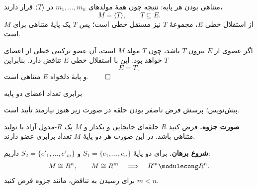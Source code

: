 \begin{frame}[t]{متناهی بودن هر پایه: نتیجه}
    \label{lec10:finite-basis-conclusion}
    چون همهٔ مولدهای $m_1,\ldots,m_n$ در $\langle T\rangle$ قرار دارند،
    \[
        M=\langle T\rangle,\qquad T\subseteq E.
    \]
    از استقلال خطی $E$، مجموعهٔ $T$ نیز مستقل خطی است؛
    پس $T$ یک پایهٔ متناهی برای $M$ است.

    اگر عضوی از $E$ بیرون $T$ باشد، چون $T$ مولد $M$ است،
    آن عضو ترکیبی خطی از اعضای $T$ خواهد بود.
    این با استقلال خطی $E$ تناقض دارد. بنابراین
    \[
        E=T,
    \]
    و پایهٔ دلخواه $E$ متناهی است.
    \hfill\(\qed\)
\end{frame}

\begin{frame}[t]{برابری تعداد اعضای دو پایه}
    \label{lec10:equal-bases}
    \begin{tblock}{پیش‌نویس؛ پرسش }
        فرض ناصفر بودن حلقه در صورت زیر هنوز نیازمند تأیید است.
    \end{tblock}
    \textbf{صورت جزوه.} فرض کنید $R$ حلقه‌ای جابجایی و یکدار و
    $M$ یک $R$-مدول آزاد با تولید متناهی باشد.
    در این صورت هر دو پایهٔ $M$ تعداد برابری عضو دارند.

    \textbf{شروع برهان.} برای دو پایهٔ
    $S_1=\{e_1,\ldots,e_n\}$ و
    $S_2=\{e'_1,\ldots,e'_m\}$ داریم:
    \[
        M\cong R^n,\qquad M\cong R^m
        \quad\Longrightarrow\quad R^m\modulecong R^n.
    \]
    برای رسیدن به تناقض، مانند جزوه فرض کنید $m<n$.
\end{frame}

